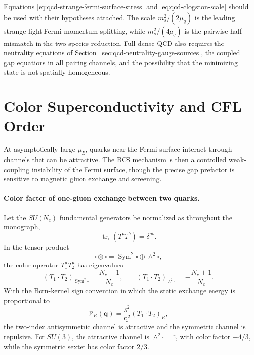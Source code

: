 \begin{remark}
\label{rem:qcd-stress-scale-status}
Equations \eqref{eq:qcd-strange-fermi-surface-stress} and
\eqref{eq:qcd-clogston-scale} should be used with their hypotheses attached.
The scale \(m_s^2/(2\mu_q)\) is the leading strange-light Fermi-momentum
splitting, while \(m_s^2/(4\mu_q)\) is the pairwise half-mismatch in the
two-species reduction.  Full dense QCD also requires the neutrality equations
of Section~\ref{sec:qcd-neutrality-gauge-sources}, the coupled gap equations
in all pairing channels, and the possibility that the minimizing state is
not spatially homogeneous.
\end{remark}

\section{Color Superconductivity and CFL Order}
\label{sec:qcd-color-superconductivity-cfl}

At asymptotically large \(\mu_B\), quarks near the Fermi surface interact
through channels that can be attractive.  The BCS mechanism is then a
controlled weak-coupling instability of the Fermi surface, though the
precise gap prefactor is sensitive to magnetic gluon exchange and screening.

\paragraph{Color factor of one-gluon exchange between two quarks.}
Let the \(SU(N_c)\) fundamental generators be normalized as throughout the
monograph,
\[
  \operatorname{tr}_{\square}(T^aT^b)=\delta^{ab}.
\]
In the tensor product
\[
  \square\otimes\square
  =
  \operatorname{Sym}^2\square
  \oplus
  \wedge^2\square ,
\]
the color operator \(T_1^aT_2^a\) has eigenvalues
\[
  \left(T_1\cdot T_2\right)_{\operatorname{Sym}^2\square}
  =
  \frac{N_c-1}{N_c},
  \qquad
  \left(T_1\cdot T_2\right)_{\wedge^2\square}
  =
  -\frac{N_c+1}{N_c}.
\]
With the Born-kernel sign convention in which the static exchange energy is
proportional to
\[
  \mathcal V_R(\mathbf q)
  =
  \frac{g^2}{\mathbf q^2}
  \left(T_1\cdot T_2\right)_R ,
\]
the two-index antisymmetric channel is attractive and the symmetric channel
is repulsive.  For \(SU(3)\), the attractive channel is
\(\wedge^2\square=\overline{\square}\), with color factor \(-4/3\), while
the symmetric sextet has color factor \(2/3\).

